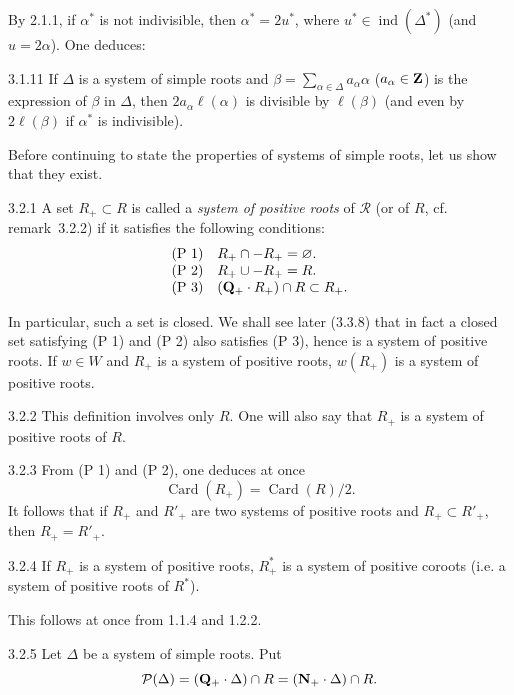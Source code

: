 {\renewcommand{\thefootnote}{(8)}}%
By 2.1.1, if $\alpha^*$ is not indivisible, then $\alpha^*=2u^*$, where $u^*\in\operatorname{ind}(\Delta^*)$ (and $u=2\alpha$). One deduces:
\begin{corollary}{3.1.11}\label{XXI.3.1.11}
If $\Delta$ is a system of simple roots and $\beta=\sum_{\alpha\in\Delta}a_\alpha\alpha$ ($a_\alpha\in\mathbf{Z}$) is the expression of $\beta$ in $\Delta$, then $2a_\alpha\ell(\alpha)$ is divisible by $\ell(\beta)$ (and even by $2\ell(\beta)$ if $\alpha^*$ is indivisible).
\end{corollary}
Before continuing to state the properties of systems of simple roots, let us show that they exist.

\begin{definition}{3.2.1}\label{XXI.3.2.1}
A set $R_+\subset R$ is called a \emph{system of positive roots} of $\mathcal R$ (or of $R$, cf. remark~3.2.2) if it satisfies the following conditions:
\[
\begin{array}{ll}
\text{(P 1)}&R_+\cap-R_+=\varnothing.\\
\text{(P 2)}&R_+\cup-R_+=R.\\
\text{(P 3)}&(\mathbf{Q}_+\cdot R_+)\cap R\subset R_+.
\end{array}
\]
\end{definition}
In particular, such a set is closed. We shall see later (3.3.8) that in fact a closed set satisfying (P 1) and (P 2) also satisfies (P 3), hence is a system of positive roots. If $w\in W$ and $R_+$ is a system of positive roots, $w(R_+)$ is a system of positive roots.
\begin{remark}{3.2.2}\label{XXI.3.2.2}
This definition involves only $R$. One will also say that $R_+$ is a system of positive roots of $R$.
\end{remark}
\begin{remark}{3.2.3}\label{XXI.3.2.3}
From (P 1) and (P 2), one deduces at once
\[
\operatorname{Card}(R_+)=\operatorname{Card}(R)/2.
\]
It follows that if $R_+$ and $R'_+$ are two systems of positive roots and $R_+\subset R'_+$, then $R_+=R'_+$.
\end{remark}
\begin{remark}{3.2.4}\label{XXI.3.2.4}
If $R_+$ is a system of positive roots, $R_+^*$ is a system of positive coroots (i.e. a system of positive roots of $R^*$).
\end{remark}
This follows at once from 1.1.4 and 1.2.2.
\begin{definition}{3.2.5}\label{XXI.3.2.5}
Let $\Delta$ be a system of simple roots. Put
\[
\mathcal P(\Delta)=(\mathbf{Q}_+\cdot\Delta)\cap R=(\mathbf{N}_+\cdot\Delta)\cap R.
\]
\end{definition}

